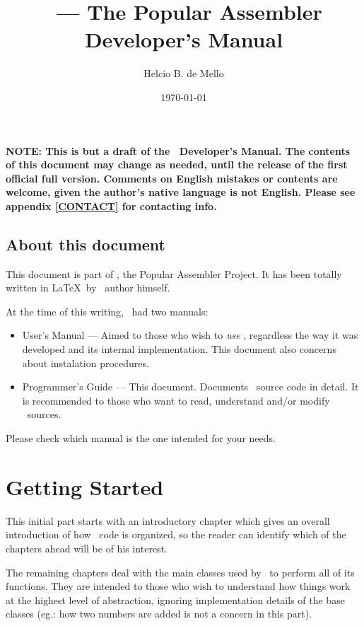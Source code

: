 \documentclass[a4paper,draft,12pt]{book}
\title{\popasm\ --- The Popular Assembler\\Developer's Manual}
\author{Helcio B. de Mello}
\date{\today}
\begin{document}
\begin{titlepage}
\maketitle
\end{titlepage}


\bf{NOTE:} This is but a draft of the \popasm\ Developer's Manual.
The contents of this document may change as needed, until the release
of the first official full version. Comments on English mistakes
or contents are welcome, given the author's native language is not
English. Please see appendix \ref{CONTACT} for contacting info.

\chapter*{About this document}
This document is part of \popasm, the Popular Assembler Project.
It has been totally written in \LaTeX\ by
\popasm\ author himself.

At the time of this writing, \popasm\ had two manuals:

\begin{itemize}
\item{User's Manual} --- Aimed to those who wish to \emph{use}
\popasm, regardless the way it was developed and its internal
implementation. This document also concerns about instalation
procedures.
\item{Programmer's Guide} --- This document. Documents \popasm\
source code in detail. It is recommended to those who want to
read, understand and/or modify \popasm\ sources.
\end{itemize}

Please check which manual is the one intended for your needs.




\tableofcontents
\newpage
\listoftables
\newpage
\listoffigures
\newpage

\part{Getting Started}
This initial part starts with an introductory chapter which gives an
overall introduction of how \popasm\ code is organized, so the reader
can identify which of the chapters ahead will be of his interest.

The remaining chapters deal with the main classes used by \popasm\ 
to perform all of its functions. They are intended to those who
wish to understand how things work at the highest level of abstraction,
ignoring implementation details of the base classes (eg.: how two
numbers are added is not a concern in this part).
\end{document}
